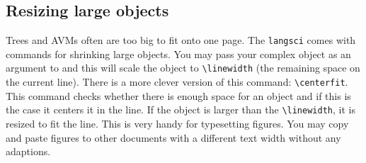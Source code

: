 \subsection{Resizing large objects}

Trees and AVMs often are too big to fit onto one page. The \texttt{langsci} comes with commands for
shrinking large objects. You may pass your complex object as an argument to \texttt{\oneline} and
this will scale the object to \verb+\linewidth+ (the remaining space on the current line). There is
a more clever version of this command: \verb+\centerfit+. This command checks whether there is
enough space for an object and if this is the case it centers it in the line. If the object is
larger than the \verb+\linewidth+, it is resized to fit the line. This is very handy for typesetting
figures. You may copy and paste figures to other documents with a different text width without any
adaptions.


